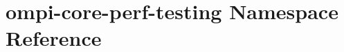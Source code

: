 \hypertarget{namespaceompi-core-perf-testing}{\section{ompi-\/core-\/perf-\/testing Namespace Reference}
\label{namespaceompi-core-perf-testing}
}
